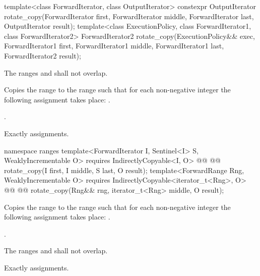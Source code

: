 %
\begin{itemdecl}
template<class ForwardIterator, class OutputIterator>
  constexpr OutputIterator
    rotate_copy(ForwardIterator first, ForwardIterator middle, ForwardIterator last,
                OutputIterator result);
template<class ExecutionPolicy, class ForwardIterator1, class ForwardIterator2>
  ForwardIterator2
    rotate_copy(ExecutionPolicy&& exec,
                ForwardIterator1 first, ForwardIterator1 middle, ForwardIterator1 last,
                ForwardIterator2 result);
\end{itemdecl}

\begin{itemdescr}
\pnum
\requires
The ranges
and
shall not overlap.

\pnum
\effects
Copies the range
to the range
such that for each non-negative integer
the following assignment takes place:
.

\pnum
\returns
{}.

\pnum
\complexity
Exactly
assignments.
\end{itemdescr}

\begin{addedblock}
%
\begin{itemdecl}
namespace ranges {
  template<ForwardIterator I, Sentinel<I> S, WeaklyIncrementable O>
    requires IndirectlyCopyable<I, O>
    @@
    @@
      rotate_copy(I first, I middle, S last, O result);
  template<ForwardRange Rng, WeaklyIncrementable O>
    requires IndirectlyCopyable<iterator_t<Rng>, O>
    @@
    @@
      rotate_copy(Rng&& rng, iterator_t<Rng> middle, O result);
}
\end{itemdecl}

\begin{itemdescr}
\pnum
\effects
Copies the range
to the range
such that for each non-negative integer
the following assignment takes place:
.

\pnum
\returns
{}.

\pnum
\requires
The ranges
and
shall not overlap.

\pnum
\complexity
Exactly
assignments.
\end{itemdescr}
\end{addedblock}

